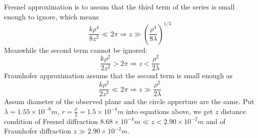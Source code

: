 \documentclass[fontsize=11pt]{scrartcl}
\begin{document}
Fresnel approximation is to assum that the third term of the series 
is small enough to ignore, which means
\begin{equation}
    \frac{k \rho^{4}}{8 z^{3}} \ll 2 \pi \Rightarrow 
    z \gg\left(\frac{\rho^{4}}{8 \lambda}\right)^{1 / 3}
    \label{eq2}
\end{equation}
Meanwhile the second term cannot be ignored:
\begin{equation}
    \frac{k \rho^{2}}{2 z^{2}} > 2 \pi \Rightarrow 
    z < \frac{\rho^2}{2\lambda} 
    \label{eq3}
\end{equation}
Fraunhofer approximation assums that the second term is small enough 
as
\begin{equation}
    \frac{k \rho^{2}}{2 z^{2}} \ll 2 \pi \Rightarrow 
    z\gg \frac{\rho^2}{2\lambda} 
    \label{eq4}
\end{equation}
Assum diameter of the observed plane and the circle apperture are the same. 
Put $\lambda = 1.55 \times 10^{-6}m$, $r = \frac{\rho}{2} = 1.5 \times 10^{-4}m$ into
equations above, we get $z$ distance condition of Fresnel diffraction 
$8.68 \times 10^{-4}m \ll z < 2.90 \times 10^{-2}m $
and of Fraunhofer diffraction $z \gg 2.90 \times 10^{-2}m$.


\end{document}
